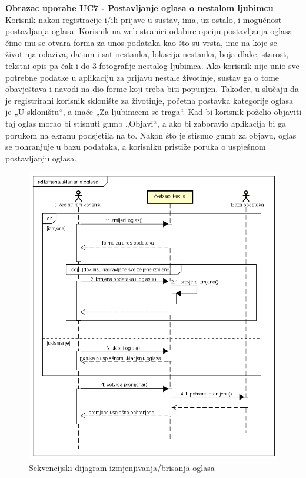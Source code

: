			\noindent\textbf{Obrazac uporabe UC7 - Postavljanje oglasa o nestalom ljubimcu}\newline
			\noindent Korisnik nakon registracije i/ili prijave u sustav, ima, uz ostalo, i mogućnost postavljanja oglasa. Korisnik na web stranici odabire opciju postavljanja oglasa čime mu se otvara forma za unos podataka kao što su vrsta, ime na koje se životinja odaziva, datum i sat nestanka, lokacija nestanka, boja dlake, starost, tekstni opis pa čak i do 3 fotografije nestalog ljubimca. Ako korisnik nije unio sve potrebne podatke u aplikaciju za prijavu nestale životinje, sustav ga o tome obavještava i navodi na dio forme koji treba biti popunjen. Također, u slučaju da je registrirani korisnik sklonište za životinje, početna postavka kategorije oglasa je „U skloništu“, a inače „Za ljubimcem se traga“. Kad bi korisnik poželio objaviti taj oglas morao bi stisnuti gumb „Objavi“, a ako bi zaboravio aplikacija bi ga porukom na ekranu podsjetila na to. Nakon što je stisnuo gumb za objavu, oglas se pohranjuje u bazu podataka, a korisniku pristiže poruka o uspješnom postavljanju oglasa.		
			
			\begin{figure}[H]
				\includegraphics[scale=0.6]{slike/seq_izmjena_oglasa.PNG} 
				\centering
				\caption{Sekvencijski dijagram izmjenjivanja/brisanja oglasa}
				\label{seq_izmjena_oglasa}
			\end{figure}
			
